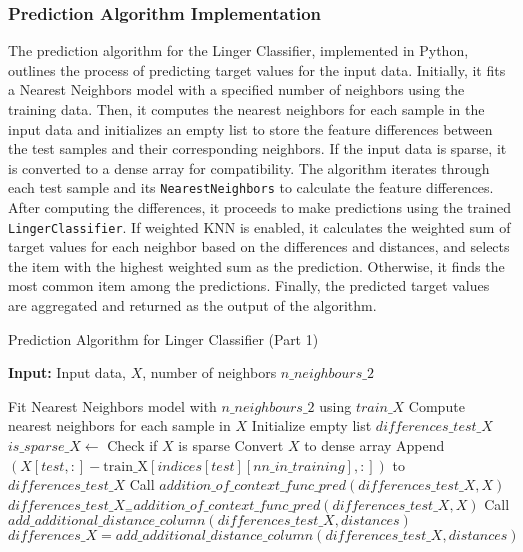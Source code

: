 \documentclass[a4paper, 12pt]{report}
\begin{document}
\subsubsection{Prediction Algorithm Implementation}
The prediction algorithm for the Linger Classifier, implemented in Python, outlines the process of predicting 
target values for the input data. Initially, it fits a Nearest Neighbors model with a specified number of 
neighbors using the training data. Then, it computes the nearest neighbors for each sample in the input 
data and initializes an empty list to store the feature differences between the test samples and their corresponding neighbors. 
If the input data is sparse, it is converted to a dense array for compatibility. 
The algorithm iterates through each test sample and its \texttt{NearestNeighbors} to calculate the feature differences. 
After computing the differences, it proceeds to make predictions using the trained \texttt{LingerClassifier}. 
If weighted KNN is enabled, it calculates the weighted sum of target values for each neighbor based on the differences 
and distances, and selects the item with the highest weighted sum as the prediction. Otherwise, 
it finds the most common item among the predictions. Finally, the predicted target values are aggregated and returned 
as the output of the algorithm.
\begin{algorithm}[H]
    \caption{Prediction Algorithm for Linger Classifier (Part 1)}
    \textbf{Input:} Input data, $X$, number of neighbors $n\_neighbours\_2$
    \label{alg:linger_classifier_predict_implementation_part1}
    \begin{algorithmic}[1]
            \State Fit Nearest Neighbors model with $n\_neighbours\_2$ using $train\_X$
            \State Compute nearest neighbors for each sample in $X$
            \State Initialize empty list $differences\_test\_X$
            \State $is\_sparse\_X \gets$ Check if $X$ is sparse
                \State Convert $X$ to dense array
            \EndIf
                    \State Append $(X[test, :] - \text{train\_X}[indices[test][nn\_in\_training], :])$ to $differences\_test\_X$
                \EndFor
            \EndFor
                \State Call $addition\_of\_context\_func\_pred(differences\_test\_X, X)$
                \State $differences\_test\_X_= addition\_of\_context\_func\_pred(differences\_test\_X, X)$
                \State Call $add\_additional\_distance\_column(differences\_test\_X, distances)$
                \State $differences\_X = add\_additional\_distance\_column(differences\_test\_X, distances)$
            \EndIf
            \EndFunction
    \end{algorithmic}
\end{algorithm}
\end{document}
